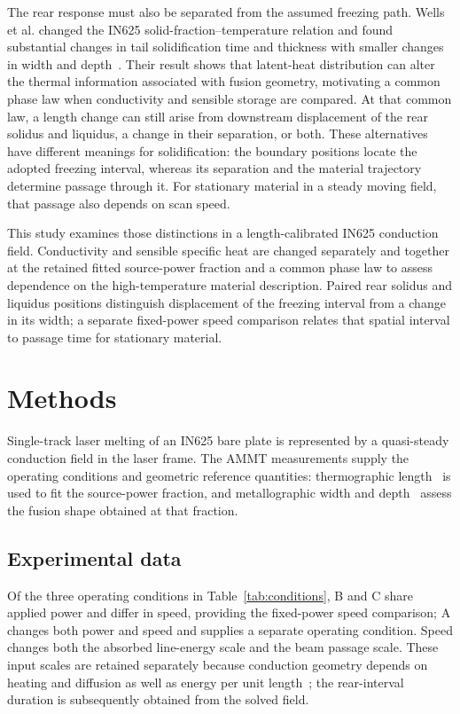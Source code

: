 \documentclass[preprint,12pt]{elsarticle}
\begin{document}
The rear response must also be separated from the assumed freezing path. Wells et al. changed the IN625 solid-fraction--temperature relation and found substantial changes in tail solidification time and thickness with smaller changes in width and depth~\cite{solidpath2024}. Their result shows that latent-heat distribution can alter the thermal information associated with fusion geometry, motivating a common phase law when conductivity and sensible storage are compared. At that common law, a length change can still arise from downstream displacement of the rear solidus and liquidus, a change in their separation, or both. These alternatives have different meanings for solidification: the boundary positions locate the adopted freezing interval, whereas its separation and the material trajectory determine passage through it. For stationary material in a steady moving field, that passage also depends on scan speed.

This study examines those distinctions in a length-calibrated IN625 conduction field. Conductivity and sensible specific heat are changed separately and together at the retained fitted source-power fraction and a common phase law to assess dependence on the high-temperature material description. Paired rear solidus and liquidus positions distinguish displacement of the freezing interval from a change in its width; a separate fixed-power speed comparison relates that spatial interval to passage time for stationary material.

\section{Methods}
\label{sec:methods}

Single-track laser melting of an IN625 bare plate is represented by a quasi-steady conduction field in the laser frame. The AMMT measurements supply the operating conditions and geometric reference quantities: thermographic length~\cite{lane2020} is used to fit the source-power fraction, and metallographic width and depth~\cite{nist2018} assess the fusion shape obtained at that fraction.

\subsection{Experimental data}
\label{sec:benchmark-design}
Of the three operating conditions in Table~\ref{tab:conditions}, B and C share applied power and differ in speed, providing the fixed-power speed comparison; A changes both power and speed and supplies a separate operating condition. Speed changes both the absorbed line-energy scale and the beam passage scale. These input scales are retained separately because conduction geometry depends on heating and diffusion as well as energy per unit length~\cite{rubenchik2018}; the rear-interval duration is subsequently obtained from the solved field.
\end{document}
